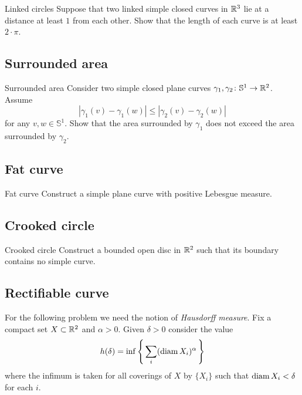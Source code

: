 \begin{pr}{}{Linked circles}\label{linked-circles}
Suppose that two linked  simple closed curves in $\mathbb{R}^3$
lie at a distance at least $1$ from each other.
Show that the length of each curve is at least $2\cdot\pi$.
\end{pr}

\subsection*{Surrounded area}

\begin{pr}{\easy}{Surrounded area}\label{Surrounded area}
Consider two simple closed plane curves  
$\gamma_1,\gamma_2\colon\mathbb S^1\to\mathbb{R}^2$.
Assume 
\[|\gamma_1(v)-\gamma_1(w)|\le|\gamma_2(v)-\gamma_2(w)|\]
for any $v,w\in \mathbb S^1$.
Show that the area surrounded by $\gamma_1$ does not exceed the area surrounded by $\gamma_2$. 
\end{pr}

\subsection*{Fat curve}

\begin{pr}{\easy}{Fat curve}\label{Fat curve}
Construct a simple plane curve with positive Lebesgue measure.
\end{pr}


\subsection*{Crooked circle}

\begin{pr}{}{Crooked circle}\label{Crooked circle} 
Construct 
a bounded open disc in $\mathbb{R}^2$ 
such that 
its boundary contains no simple curve.
\end{pr}

\subsection*{Rectifiable curve}

For the following problem we need the notion of 
\emph{Hausdorff measure}.
Fix a compact set $X\subset\mathbb{R}^2$ and $\alpha>0$.
Given $\delta>0$ consider the value
\[h(\delta)=\inf\left\{\,\sum_i(\operatorname{\rm diam} X_i)^\alpha\,\right\}\]
where the infimum is taken for all coverings of $X$ by $\{X_i\}$
such that $\operatorname{\rm diam} X_i<\delta$ for each $i$.

